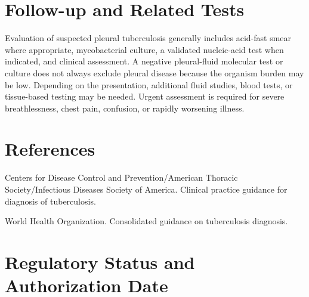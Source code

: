 \section*{Follow-up and Related Tests}
Evaluation of suspected pleural tuberculosis generally includes acid-fast smear where appropriate, mycobacterial culture, a validated nucleic-acid test when indicated, and clinical assessment. A negative pleural-fluid molecular test or culture does not always exclude pleural disease because the organism burden may be low. Depending on the presentation, additional fluid studies, blood tests, or tissue-based testing may be needed. Urgent assessment is required for severe breathlessness, chest pain, confusion, or rapidly worsening illness.

\section*{References}
Centers for Disease Control and Prevention/American Thoracic Society/Infectious Diseases Society of America. Clinical practice guidance for diagnosis of tuberculosis.

World Health Organization. Consolidated guidance on tuberculosis diagnosis.

\clearpage


\section*{Regulatory Status and Authorization Date}

\clearpage
